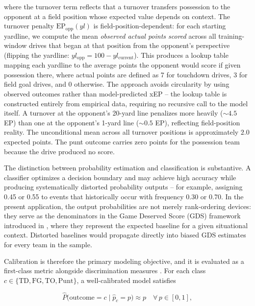 where the turnover term reflects that a turnover transfers possession to the
opponent at a field position whose expected value depends on context. The
turnover penalty $\mathrm{EP}_{\mathrm{opp}}(yl)$ is field-position-dependent:
for each starting yardline, we compute the mean \emph{observed actual points
scored} across all training-window drives that began at that position from the
opponent's perspective (flipping the yardline: $yl_{\mathrm{opp}} = 100 -
yl_{\mathrm{current}}$). This produces a lookup table mapping each yardline to
the average points the opponent would score if given possession there, where
actual points are defined as 7 for touchdown drives, 3 for field goal drives,
and 0 otherwise. The approach avoids circularity by using observed outcomes
rather than model-predicted xEP -- the lookup table is constructed entirely from
empirical data, requiring no recursive call to the model itself. A turnover at
the opponent's 20-yard line penalizes more heavily (${\sim}4.5$ EP) than one at
the opponent's 1-yard line (${\sim}0.5$ EP), reflecting field-position reality.
The unconditional mean across all turnover positions is approximately $2.0$
expected points. The punt outcome carries zero points for the possession team
because the drive produced no score.

The distinction between probability estimation and classification is
substantive. A classifier optimizes a decision boundary and may achieve high
accuracy while producing systematically distorted probability outputs -- for
example, assigning 0.45 or 0.55 to events that historically occur with
frequency 0.30 or 0.70. In the present application, the output probabilities
are not merely rank-ordering devices: they serve as the denominators in the
Game Deserved Score (GDS) framework introduced in , where they
represent the expected baseline for a given situational context. Distorted
baselines would propagate directly into biased GDS estimates for every team in
the sample.

Calibration is therefore the primary modeling objective, and it is evaluated
as a first-class metric alongside discrimination measures
\parencite{niculescumizil2005probabilities}. For each class $c \in
\{\text{TD}, \text{FG}, \text{TO}, \text{Punt}\}$, a well-calibrated model
satisfies

\begin{equation}
  \hat{P}\!\bigl(\text{outcome} = c \mid \hat{p}_c = p\bigr) \approx p
  \quad \forall\, p \in [0,1],
\end{equation}

